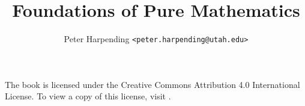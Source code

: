 \theoremstyle{plain}
\newtheorem{axiom}{Axiom}[section]
\newtheorem{definition}[axiom]{Definition}
\newtheorem{theorem}[axiom]{Theorem}
\newtheorem{lemma}[axiom]{Lemma}

\theoremstyle{definition}
\newtheorem{example}[axiom]{Example}
\newtheorem{remark}[axiom]{Remark}
\newtheorem{aside}[axiom]{Aside}
\newtheorem{exercise}{Exercise}[section]


\title{Foundations of Pure Mathematics}
\author{Peter Harpending {\footnotesize \texttt{<peter.harpending@utah.edu>}}}
\maketitle

\noindent\hrulefill

The book is licensed under the Creative Commons Attribution 4.0
International License. To view a copy of this license, visit
.

\noindent\hrulefill

\tableofcontents



\begin{appendices}
  
  
\end{appendices}

\printbibliography

